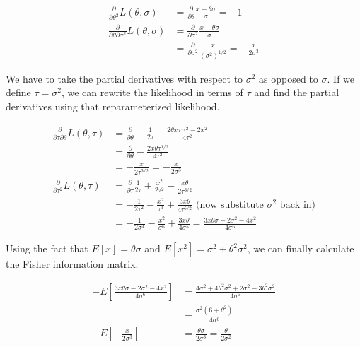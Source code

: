 \documentclass[12pt,a4paper]{article}
\begin{document}
\begin{align*}
	\frac{\partial}{\partial \theta^2} L(\theta, \sigma) &= \frac{\partial}{\partial \theta} \frac{x - \theta\sigma}{\sigma} = -1 \\
	\frac{\partial}{\partial \theta \partial \sigma^2} L(\theta, \sigma) &= \frac{\partial}{\partial \sigma^2} \frac{x - \theta \sigma}{\sigma} \\
																		 &= \frac{\partial}{\partial \sigma^2} \frac{x}{(\sigma^2)^{1/2}} = -\frac{x}{2\sigma^3}
\end{align*}

We have to take the partial derivatives with respect to $\sigma^2$ as opposed to $\sigma$.
If we define $\tau = \sigma^2$, we can rewrite the likelihood in terms of $\tau$ and find the partial derivatives using that reparameterized likelihood.

\begin{align*}
	\frac{\partial}{\partial \tau \partial \theta} L(\theta, \tau) &= \frac{\partial}{\partial \theta} -\frac{1}{2\tau} - \frac{2\theta x \tau^{1/2} - 2x^2}{4\tau^2} \\
																   &= \frac{\partial}{\partial \theta} -\frac{2 x \theta \tau^{1/2}}{4 \tau^2} \\
																   &= -\frac{x}{2\tau^{3/2}} = - \frac{x}{2\sigma^3}\\
	\frac{\partial}{\partial \tau^2} L(\theta, \tau) &= \frac{\partial}{\partial \tau} \frac{1}{2\tau} + \frac{x^2}{2\tau^2} - \frac{x\theta}{2\tau^{3/2}} \\
													 &= -\frac{1}{2\tau^2} - \frac{x^2}{\tau^3} + \frac{3x\theta}{4 \tau^{5/2}} \text{ (now substitute }\sigma^2\text{ back in)}\\
									 &= -\frac{1}{2\sigma^4} - \frac{x^2}{\sigma^6} + \frac{3x\theta}{4\sigma^5} = \frac{3x\theta \sigma - 2\sigma^2 - 4x^2}{4 \sigma^6}
\end{align*}

Using the fact that $E[x] = \theta \sigma$ and $E[x^2] = \sigma^2 + \theta^2\sigma^2$, we can finally calculate the Fisher information matrix.

\begin{align*}
	-E\left[\frac{3x\theta\sigma - 2\sigma^2 - 4x^2}{4\sigma^6}\right]  &= \frac{4\sigma^2 + 4\theta^2\sigma^2 + 2\sigma^2 - 3\theta^2\sigma^2}{4\sigma^6} \\
																		&= \frac{\sigma^2(6 + \theta^2)}{4\sigma^6} \\
	-E\left[-\frac{x}{2\sigma^3}\right] &= \frac{\theta \sigma}{2\sigma^3} = \frac{\theta}{2\sigma^2}
\end{align*}
\end{document}
